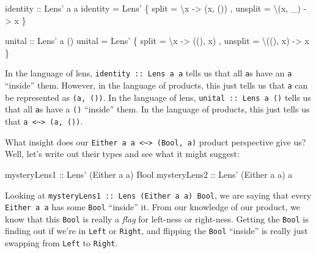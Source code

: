 \documentclass[]{article}
\newenvironment{Shaded}{}{}
\newcommand{\DataTypeTok}[1]{\textcolor[rgb]{0.56,0.13,0.00}{#1}}
\newcommand{\FunctionTok}[1]{\textcolor[rgb]{0.02,0.16,0.49}{#1}}
\newcommand{\NormalTok}[1]{#1}
\newcommand{\OtherTok}[1]{\textcolor[rgb]{0.00,0.44,0.13}{#1}}
\begin{document}
\begin{Shaded}
\begin{Highlighting}[]
\OtherTok{identity ::} \DataTypeTok{Lens'}\NormalTok{ a a}
\NormalTok{identity }\FunctionTok{=} \DataTypeTok{Lens'}\NormalTok{ \{ split   }\FunctionTok{=}\NormalTok{ \textbackslash{}x      }\OtherTok{->}\NormalTok{ (x, ())}
\NormalTok{                 , unsplit }\FunctionTok{=}\NormalTok{ \textbackslash{}(x, _) }\OtherTok{->}\NormalTok{ x}
\NormalTok{                 \}}

\OtherTok{unital ::} \DataTypeTok{Lens'}\NormalTok{ a ()}
\NormalTok{unital }\FunctionTok{=} \DataTypeTok{Lens'}\NormalTok{ \{ split   }\FunctionTok{=}\NormalTok{ \textbackslash{}x       }\OtherTok{->}\NormalTok{ ((), x)}
\NormalTok{               , unsplit }\FunctionTok{=}\NormalTok{ \textbackslash{}((), x) }\OtherTok{->}\NormalTok{ x}
\NormalTok{               \}}
\end{Highlighting}
\end{Shaded}

In the language of lens, \texttt{identity\ ::\ Lens\textquotesingle{}\ a\ a}
tells us that all \texttt{a}s have an \texttt{a} ``inside'' them. However, in
the language of products, this just tells us that \texttt{a} can be represented
as \texttt{(a,\ ())}. In the language of lens,
\texttt{unital\ ::\ Lens\textquotesingle{}\ a\ ()} tells us that all \texttt{a}s
have a \texttt{()} ``inside'' them. In the language of products, this just tells
us that \texttt{a\ \textless{}\textasciitilde{}\textgreater{}\ (a,\ ())}.

What insight does our
\texttt{Either\ a\ a\ \textless{}\textasciitilde{}\textgreater{}\ (Bool,\ a)}
product perspective give us? Well, let's write out their types and see what it
might suggest:

\begin{Shaded}
\begin{Highlighting}[]
\OtherTok{mysteryLens1 ::} \DataTypeTok{Lens'}\NormalTok{ (}\DataTypeTok{Either}\NormalTok{ a a) }\DataTypeTok{Bool}
\OtherTok{mysteryLens2 ::} \DataTypeTok{Lens'}\NormalTok{ (}\DataTypeTok{Either}\NormalTok{ a a) a}
\end{Highlighting}
\end{Shaded}

Looking at
\texttt{mysteryLens1\ ::\ Lens\textquotesingle{}\ (Either\ a\ a)\ Bool}, we are
saying that every \texttt{Either\ a\ a} has some \texttt{Bool} ``inside'' it.
From our knowledge of our product, we know that this \texttt{Bool} is really a
\emph{flag} for left-ness or right-ness. Getting the \texttt{Bool} is finding
out if we're in \texttt{Left} or \texttt{Right}, and flipping the \texttt{Bool}
``inside'' is really just swapping from \texttt{Left} to \texttt{Right}.
\end{document}
